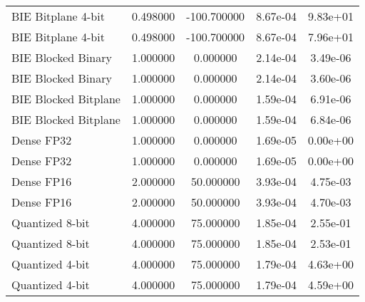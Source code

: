 \begin{table}
\begin{tabular}{lcccc}
BIE Bitplane 4-bit & 0.498000 & -100.700000 & 8.67e-04 & 9.83e+01 \\
BIE Bitplane 4-bit & 0.498000 & -100.700000 & 8.67e-04 & 7.96e+01 \\
BIE Blocked Binary & 1.000000 & 0.000000 & 2.14e-04 & 3.49e-06 \\
BIE Blocked Binary & 1.000000 & 0.000000 & 2.14e-04 & 3.60e-06 \\
BIE Blocked Bitplane & 1.000000 & 0.000000 & 1.59e-04 & 6.91e-06 \\
BIE Blocked Bitplane & 1.000000 & 0.000000 & 1.59e-04 & 6.84e-06 \\
Dense FP32 & 1.000000 & 0.000000 & 1.69e-05 & 0.00e+00 \\
Dense FP32 & 1.000000 & 0.000000 & 1.69e-05 & 0.00e+00 \\
Dense FP16 & 2.000000 & 50.000000 & 3.93e-04 & 4.75e-03 \\
Dense FP16 & 2.000000 & 50.000000 & 3.93e-04 & 4.70e-03 \\
Quantized 8-bit & 4.000000 & 75.000000 & 1.85e-04 & 2.55e-01 \\
Quantized 8-bit & 4.000000 & 75.000000 & 1.85e-04 & 2.53e-01 \\
Quantized 4-bit & 4.000000 & 75.000000 & 1.79e-04 & 4.63e+00 \\
Quantized 4-bit & 4.000000 & 75.000000 & 1.79e-04 & 4.59e+00 \\
\bottomrule
\end{tabular}
\end{table}
